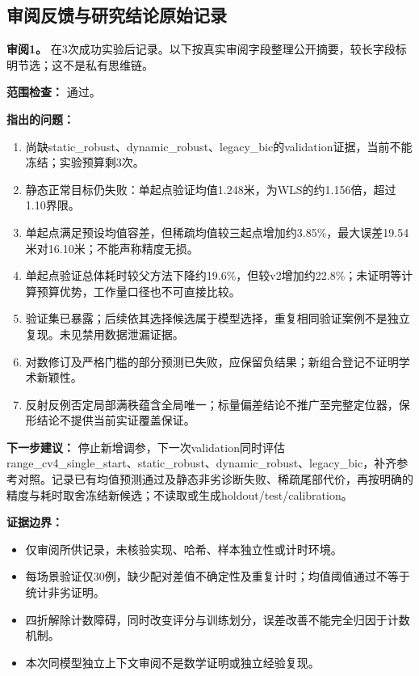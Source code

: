 \subsection{审阅反馈与研究结论原始记录}

\noindent\textbf{审阅1。} 在3次成功实验后记录。以下按真实审阅字段整理公开摘要，较长字段标明节选；这不是私有思维链。

\noindent\textbf{范围检查：} 通过。

\noindent\textbf{指出的问题：}\begin{enumerate}[leftmargin=2em,nosep]
\item 尚缺static\_\allowbreak{}robust、dynamic\_\allowbreak{}robust、legacy\_\allowbreak{}bic的validation证据，当前不能冻结；实验预算剩3次。
\item 静态正常目标仍失败：单起点验证均值1.248米，为WLS的约1.156倍，超过1.10界限。
\item 单起点满足预设均值容差，但稀疏均值较三起点增加约3.85\%，最大误差19.54米对16.10米；不能声称精度无损。
\item 单起点验证总体耗时较父方法下降约19.6\%，但较v2增加约22.8\%；未证明等计算预算优势，工作量口径也不可直接比较。
\item 验证集已暴露；后续依其选择候选属于模型选择，重复相同验证案例不是独立复现。未见禁用数据泄漏证据。
\item 对数修订及严格门槛的部分预测已失败，应保留负结果；新组合登记不证明学术新颖性。
\item 反射反例否定局部满秩蕴含全局唯一；标量偏差结论不推广至完整定位器，保形结论不提供当前实证覆盖保证。\end{enumerate}

\noindent\textbf{下一步建议：} 停止新增调参，下一次validation同时评估range\_\allowbreak{}cv4\_\allowbreak{}single\_\allowbreak{}start、static\_\allowbreak{}robust、dynamic\_\allowbreak{}robust、legacy\_\allowbreak{}bic，补齐参考对照。记录已有均值预测通过及静态非劣诊断失败、稀疏尾部代价，再按明确的精度与耗时取舍冻结新候选；不读取或生成holdout/test/calibration。

\noindent\textbf{证据边界：}\begin{itemize}[leftmargin=2em,nosep]
\item 仅审阅所供记录，未核验实现、哈希、样本独立性或计时环境。
\item 每场景验证仅30例，缺少配对差值不确定性及重复计时；均值阈值通过不等于统计非劣证明。
\item 四折解除计数障碍，同时改变评分与训练划分，误差改善不能完全归因于计数机制。
\item 本次同模型独立上下文审阅不是数学证明或独立经验复现。\end{itemize}

